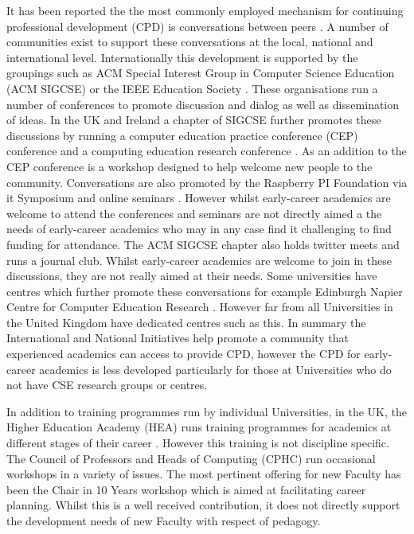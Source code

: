 \documentclass[sigconf]{acmart}
\begin{document}
It has been reported the the most commonly employed mechanism for continuing professional development (CPD) is conversations between peers \cite{King2004} . A number of communities exist to support these conversations at the local, national and international level.  Internationally this development is supported by the groupings such as ACM Special Interest Group in Computer Science Education (ACM SIGCSE) \cite{SIGCSE} or the IEEE Education Society \cite{IEEEES}.  These organisations run a number of conferences to promote discussion and dialog as well as dissemination of ideas. In the UK and Ireland a chapter of SIGCSE \cite{UKI-SIGCSE} further promotes these discussions by running a computer education practice conference (CEP) conference \cite{CEP} and a computing education research conference \cite{UKICER}. As an addition to the CEP conference is a workshop designed to help welcome new people to the community. Conversations are also promoted by the Raspberry PI Foundation via it Symposium \cite{PI_SYM} and online seminars \cite{PI_Sem}. However whilst early-career academics are welcome to attend the conferences and seminars are not directly aimed a the needs of early-career academics who may in any case find it challenging to find funding for attendance. The ACM SIGCSE chapter also holds twitter meets and runs a journal club. Whilst early-career academics are welcome to join in these discussions, they are not really aimed at their needs.  Some universities have centres which further promote these conversations for example Edinburgh Napier Centre for Computer Education Research \cite{Napier}. However far from all Universities in the United Kingdom have dedicated centres such as this. In summary the International and National Initiatives help promote a community that experienced academics can access to provide CPD, however the CPD for early-career academics is less developed particularly for those at Universities who do not have CSE research groups or centres.

In addition to training programmes run by individual Universities, in the UK, the Higher Education Academy (HEA) runs training programmes for academics at different stages of their career \cite{HEATraining}. However this training is not discipline specific. The Council of Professors and Heads of Computing (CPHC) run occasional workshops in a variety of issues. The most pertinent offering for new Faculty has been the Chair in 10 Years workshop which is aimed at facilitating career planning. Whilst this is a well received contribution, it does not directly support the development needs of new Faculty with respect of pedagogy.
\end{document}
